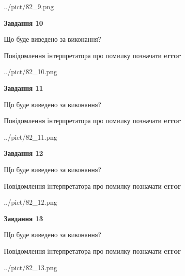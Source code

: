 \documentclass[11pt, ukrainian]{article}
\begin{document}
{\begin {large}
\begin{center}
	{../pict/82_9.png}
\end{center}
\newpage

{\begin {center}\textbf{Завдання 10}\end {center}}\par
Що буде виведено за виконання? \par
Повідомлення інтерпретатора про помилку позначати \textbf{error}

\begin{center}
	{../pict/82_10.png}
\end{center}
\newpage

{\begin {center}\textbf{Завдання 11}\end {center}}\par
Що буде виведено за виконання? \par
Повідомлення інтерпретатора про помилку позначати \textbf{error}

\begin{center}
	{../pict/82_11.png}
\end{center}
\newpage

{\begin {center}\textbf{Завдання 12}\end {center}}\par
Що буде виведено за виконання? \par
Повідомлення інтерпретатора про помилку позначати \textbf{error}

\begin{center}
	{../pict/82_12.png}
\end{center}
\newpage

{\begin {center}\textbf{Завдання 13}\end {center}}\par
Що буде виведено за виконання? \par
Повідомлення інтерпретатора про помилку позначати \textbf{error}

\begin{center}
	{../pict/82_13.png}
\end{center}
\newpage


\end{large}}
\end{document}
